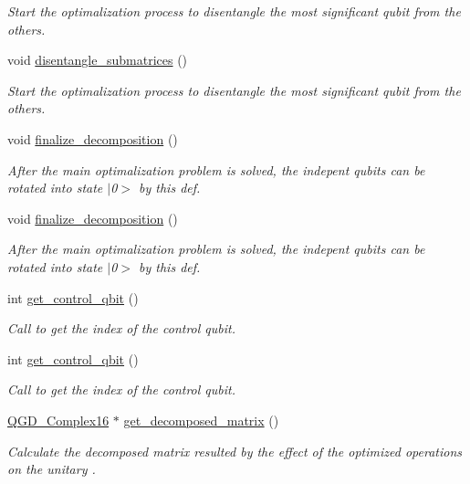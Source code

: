 \begin{DoxyCompactItemize}
\begin{DoxyCompactList}\small\item\em Start the optimalization process to disentangle the most significant qubit from the others. \end{DoxyCompactList}\item 
void \hyperlink{class_sub___matrix___decomposition_a8522d56a01b94f51e477c01ad917a5e3}{disentangle\+\_\+submatrices} ()
\begin{DoxyCompactList}\small\item\em Start the optimalization process to disentangle the most significant qubit from the others. \end{DoxyCompactList}\item 
void \hyperlink{class_decomposition___base_a0cdd12741e72e2c074a188fe3867e6d5}{finalize\+\_\+decomposition} ()
\begin{DoxyCompactList}\small\item\em After the main optimalization problem is solved, the indepent qubits can be rotated into state $\vert$0$>$ by this def. \end{DoxyCompactList}\item 
void \hyperlink{class_decomposition___base_a0cdd12741e72e2c074a188fe3867e6d5}{finalize\+\_\+decomposition} ()
\begin{DoxyCompactList}\small\item\em After the main optimalization problem is solved, the indepent qubits can be rotated into state $\vert$0$>$ by this def. \end{DoxyCompactList}\item 
int \hyperlink{class_operation_a2e9b60d334a0e0c99dede014ac989d0a}{get\+\_\+control\+\_\+qbit} ()
\begin{DoxyCompactList}\small\item\em Call to get the index of the control qubit. \end{DoxyCompactList}\item 
int \hyperlink{class_operation_a2e9b60d334a0e0c99dede014ac989d0a}{get\+\_\+control\+\_\+qbit} ()
\begin{DoxyCompactList}\small\item\em Call to get the index of the control qubit. \end{DoxyCompactList}\item 
\hyperlink{struct_q_g_d___complex16}{Q\+G\+D\+\_\+\+Complex16} $\ast$ \hyperlink{class_decomposition___base_a40154345dce69fd5a9cb28c0b677746b}{get\+\_\+decomposed\+\_\+matrix} ()
\begin{DoxyCompactList}\small\item\em Calculate the decomposed matrix resulted by the effect of the optimized operations on the unitary . \end{DoxyCompactList}\item 

\end{DoxyCompactItemize}
